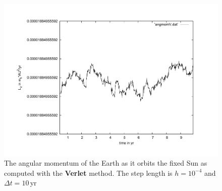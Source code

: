 \documentclass[11pt,a4wide]{article}
\begin{document}
	\begin{figure}
		\centering
			\includegraphics[scale=0.45]{angmomV.pdf}
		\caption{The angular momentum of the Earth as it orbits the fixed Sun as computed with the \textbf{Verlet} method. The step length is $h=10^{-4}$ and $\Delta t=10$\,yr}
		\label{fig:amv}
	\end{figure}
	
\end{document}
